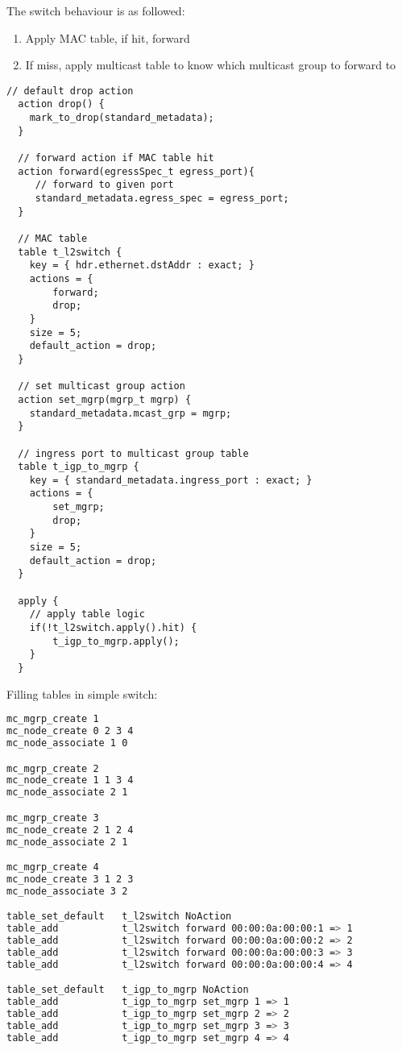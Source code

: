 \documentclass[a4paper, fontsize=8pt, landscape, DIV=1]{scrartcl}
\begin{document}
\begin{multicols*}{3}
  The switch behaviour is as followed:
  \begin{enumerate}
    \item Apply MAC table, if hit, forward
    \item If miss, apply multicast table to know which multicast group to forward to
  \end{enumerate}

  \begin{lstlisting}[style=P4style]
  // default drop action
  action drop() {
    mark_to_drop(standard_metadata);
  }

  // forward action if MAC table hit
  action forward(egressSpec_t egress_port){
     // forward to given port
     standard_metadata.egress_spec = egress_port;
  }

  // MAC table
  table t_l2switch {
    key = { hdr.ethernet.dstAddr : exact; }
    actions = {
        forward;
        drop;
    }
    size = 5;
    default_action = drop;
  }

  // set multicast group action
  action set_mgrp(mgrp_t mgrp) {
    standard_metadata.mcast_grp = mgrp;
  }

  // ingress port to multicast group table
  table t_igp_to_mgrp {
    key = { standard_metadata.ingress_port : exact; }
    actions = {
        set_mgrp;
        drop;
    }
    size = 5;
    default_action = drop;
  }

  apply {
    // apply table logic
    if(!t_l2switch.apply().hit) {
        t_igp_to_mgrp.apply();
    }
  }\end{lstlisting}

  Filling tables in simple switch:

  \begin{lstlisting}[language=bash]mc_mgrp_create 1
mc_node_create 0 2 3 4
mc_node_associate 1 0

mc_mgrp_create 2
mc_node_create 1 1 3 4
mc_node_associate 2 1

mc_mgrp_create 3
mc_node_create 2 1 2 4
mc_node_associate 2 1

mc_mgrp_create 4
mc_node_create 3 1 2 3
mc_node_associate 3 2

table_set_default   t_l2switch NoAction
table_add           t_l2switch forward 00:00:0a:00:00:1 => 1
table_add           t_l2switch forward 00:00:0a:00:00:2 => 2
table_add           t_l2switch forward 00:00:0a:00:00:3 => 3
table_add           t_l2switch forward 00:00:0a:00:00:4 => 4

table_set_default   t_igp_to_mgrp NoAction
table_add           t_igp_to_mgrp set_mgrp 1 => 1
table_add           t_igp_to_mgrp set_mgrp 2 => 2
table_add           t_igp_to_mgrp set_mgrp 3 => 3
table_add           t_igp_to_mgrp set_mgrp 4 => 4\end{lstlisting}



\end{multicols*}
\end{document}
